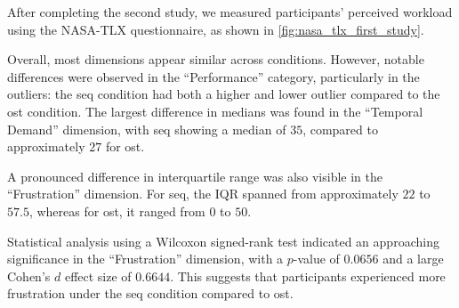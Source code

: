 After completing the second study, we measured participants' perceived workload using the NASA-TLX questionnaire, as shown in \autoref{fig:nasa_tlx_first_study}. 

Overall, most dimensions appear similar across conditions. However, notable differences were observed in the \enquote{Performance} category, particularly in the outliers: the \gls{seq} condition had both a higher and lower outlier compared to the \gls{ost} condition. The largest difference in medians was found in the \enquote{Temporal Demand} dimension, with \gls{seq} showing a median of $35$, compared to approximately $27$ for \gls{ost}. 

A pronounced difference in interquartile range was also visible in the \enquote{Frustration} dimension. For \gls{seq}, the IQR spanned from approximately $22$ to $57.5$, whereas for \gls{ost}, it ranged from $0$ to $50$.

Statistical analysis using a Wilcoxon signed-rank test indicated an approaching significance in the \enquote{Frustration} dimension, with a $p$-value of $0.0656$ and a large Cohen’s $d$ effect size of $0.6644$. This suggests that participants experienced more frustration under the \gls{seq} condition compared to \gls{ost}.


\begin{table}[ht]
\caption{Results of the Friedman significance tests for the different NasaTLX dimensions with a Kendall's W Effect Size.}
\label{table:nasaTLX_significance_secondStudy_nonParam}
\end{table}


